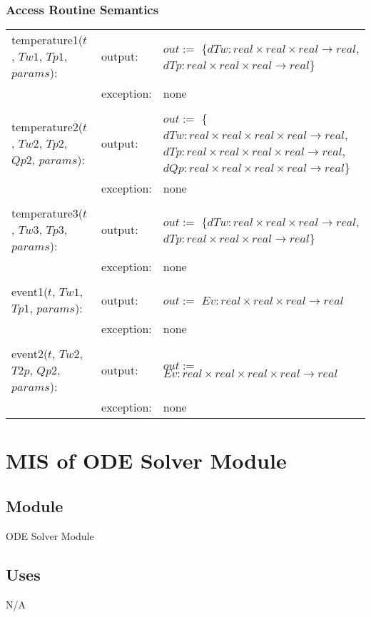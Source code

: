 \documentclass[12pt]{article}
\begin{document}
\subsubsection{Access Routine Semantics}
\begin{center}
\begin{tabular}{l l p{6cm}}
temperature1($t$, $Tw1$, $Tp1$, $params$): & output: & $out :=$ \{$dTw: real \times real \times real \rightarrow real$, $dTp: real \times real \times real \rightarrow real$\} \\
& exception: & none \\ \\
temperature2($t$, $Tw2$, $Tp2$, $Qp2$, $params$): & output: & $out :=$ \{$dTw: real \times real \times real \times real \rightarrow real$, $dTp: real \times real \times real \times real \rightarrow real$, $dQp: real \times real \times real \times real \rightarrow real$\} \\
& exception: & none \\ \\
temperature3($t$, $Tw3$, $Tp3$, $params$): & output: & $out :=$ \{$dTw: real \times real \times real \rightarrow real$, $dTp: real \times real \times real \rightarrow real$\} \\
& exception: & none \\ \\
event1($t$, $Tw1$, $Tp1$, $params$): & output: & $out :=$ $Ev: real \times real \times real \rightarrow real$ \\ 
& exception: & none \\ \\
event2($t$, $Tw2$, $T2p$, $Qp2$, $params$): & output: & $out :=$ $Ev: real \times real \times real \times real \rightarrow real$ \\
& exception: & none \\
\end{tabular}
\end{center}

\section{MIS of ODE Solver Module} \label{ODE}
\subsection{Module}
ODE Solver Module
\subsection{Uses}
N/A
\end{document}

